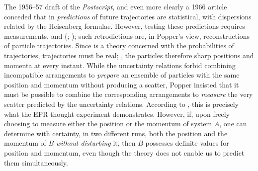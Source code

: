 \documentclass[pdflatex]{sn-jnl}
\renewcommand{\cite}{\citealp}
\newcommand{\TE}{thought experiment\xspace}
\newcommand{\UR}{uncertainty relations\xspace}
\begin{document}

The 1956--57 draft of the \emph{Postscript}, and even more clearly a 1966 article \citep{Popper1967} conceded that in \qm \emph{predictions} of future trajectories are statistical, with dispersions related by the Heisenberg formulae. However, testing these predictions requires measurements, and  (\cite[25]{Popper1967}; \cite[60]{Popper1982}); such retrodictions are, in Popper's view, reconstructions of particle trajectories. Since \qm is a theory concerned with the probabilities of trajectories, trajectories must be real; \ie, the particles therefore  sharp positions and momenta at every instant. While the \UR forbid combining incompatible arrangements to \emph{prepare} an ensemble of particles with the same position and momentum without producing a scatter, Popper insisted that it must be possible to combine the corresponding arrangements to \emph{measure} the very scatter predicted by the \UR \citep[21]{Popper1967}. According to \citet[III-17]{Popper1982}, this is precisely what the EPR \TE demonstrates. However, if, upon freely choosing to measure either the position or the momentum of system $A$, one can determine with certainty, in two different runs, both the position and the momentum of $B$ \emph{without disturbing} it, then $B$ possesses definite values for position and momentum, even though the theory does not enable us to predict them simultaneously.
\end{document}
